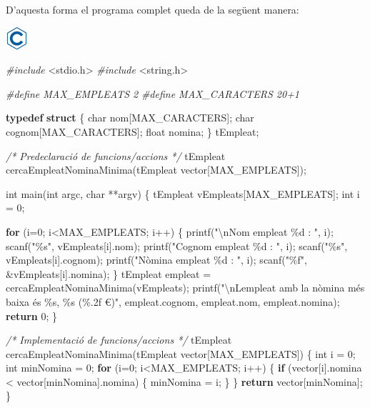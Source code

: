 \documentclass[
]{book}
\newenvironment{Shaded}{\begin{snugshade}}{\end{snugshade}}
\newcommand{\CommentTok}[1]{\textcolor[rgb]{0.56,0.35,0.01}{\textit{#1}}}
\newcommand{\ControlFlowTok}[1]{\textcolor[rgb]{0.13,0.29,0.53}{\textbf{#1}}}
\newcommand{\DataTypeTok}[1]{\textcolor[rgb]{0.13,0.29,0.53}{#1}}
\newcommand{\DecValTok}[1]{\textcolor[rgb]{0.00,0.00,0.81}{#1}}
\newcommand{\ImportTok}[1]{#1}
\newcommand{\KeywordTok}[1]{\textcolor[rgb]{0.13,0.29,0.53}{\textbf{#1}}}
\newcommand{\NormalTok}[1]{#1}
\newcommand{\PreprocessorTok}[1]{\textcolor[rgb]{0.56,0.35,0.01}{\textit{#1}}}
\newcommand{\SpecialCharTok}[1]{\textcolor[rgb]{0.00,0.00,0.00}{#1}}
\newcommand{\StringTok}[1]{\textcolor[rgb]{0.31,0.60,0.02}{#1}}
\begin{document}
D'aquesta forma el programa complet queda de la següent manera:

\includegraphics{./img/c.png}

\begin{Shaded}
\begin{Highlighting}[]
\PreprocessorTok{\#include }\ImportTok{\textless{}stdio.h\textgreater{}}
\PreprocessorTok{\#include }\ImportTok{\textless{}string.h\textgreater{}}

\PreprocessorTok{\#define MAX\_EMPLEATS 2}
\PreprocessorTok{\#define MAX\_CARACTERS 20+1}

\KeywordTok{typedef} \KeywordTok{struct}\NormalTok{ \{}
    \DataTypeTok{char}\NormalTok{ nom[MAX\_CARACTERS];}
    \DataTypeTok{char}\NormalTok{ cognom[MAX\_CARACTERS];}
    \DataTypeTok{float}\NormalTok{ nomina;}
\NormalTok{\} tEmpleat;}

\CommentTok{/* Predeclaració de funcions/accions */}
\NormalTok{tEmpleat cercaEmpleatNominaMinima(tEmpleat vector[MAX\_EMPLEATS]);}

\DataTypeTok{int}\NormalTok{ main(}\DataTypeTok{int}\NormalTok{ argc, }\DataTypeTok{char}\NormalTok{ **argv) \{}
\NormalTok{    tEmpleat vEmpleats[MAX\_EMPLEATS];}
    \DataTypeTok{int}\NormalTok{ i = }\DecValTok{0}\NormalTok{;}

    \ControlFlowTok{for}\NormalTok{ (i=}\DecValTok{0}\NormalTok{; i\textless{}MAX\_EMPLEATS; i++) \{}
\NormalTok{        printf(}\StringTok{"}\SpecialCharTok{\textbackslash{}n}\StringTok{Nom empleat \%d : "}\NormalTok{, i);}
\NormalTok{        scanf(}\StringTok{"\%s"}\NormalTok{, vEmpleats[i].nom);}
\NormalTok{        printf(}\StringTok{"Cognom empleat \%d : "}\NormalTok{, i);}
\NormalTok{        scanf(}\StringTok{"\%s"}\NormalTok{, vEmpleats[i].cognom);}
\NormalTok{        printf(}\StringTok{"Nòmina empleat \%d : "}\NormalTok{, i);}
\NormalTok{        scanf(}\StringTok{"\%f"}\NormalTok{, \&vEmpleats[i].nomina);}
\NormalTok{    \}}
\NormalTok{    tEmpleat empleat = cercaEmpleatNominaMinima(vEmpleats);}
\NormalTok{    printf(}\StringTok{"}\SpecialCharTok{\textbackslash{}n}\StringTok{L\textquotesingle{}empleat amb la nòmina més baixa és \%s, \%s (\%.2f €)"}\NormalTok{, empleat.cognom, empleat.nom, empleat.nomina);}
    \ControlFlowTok{return} \DecValTok{0}\NormalTok{;}
\NormalTok{\}}

\CommentTok{/* Implementació de funcions/accions */}
\NormalTok{tEmpleat cercaEmpleatNominaMinima(tEmpleat vector[MAX\_EMPLEATS]) \{}
    \DataTypeTok{int}\NormalTok{ i = }\DecValTok{0}\NormalTok{; }
    \DataTypeTok{int}\NormalTok{ minNomina = }\DecValTok{0}\NormalTok{;}
    \ControlFlowTok{for}\NormalTok{ (i=}\DecValTok{0}\NormalTok{; i\textless{}MAX\_EMPLEATS; i++) \{}
        \ControlFlowTok{if}\NormalTok{ (vector[i].nomina \textless{} vector[minNomina].nomina) \{}
\NormalTok{            minNomina = i;}
\NormalTok{        \}}
\NormalTok{    \}}
    \ControlFlowTok{return}\NormalTok{ vector[minNomina];}
\NormalTok{\}}
\end{Highlighting}
\end{Shaded}
\end{document}
